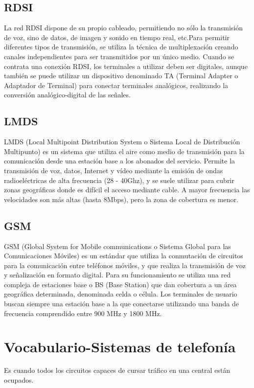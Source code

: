 \documentclass[
	11pt, %
	fleqn, %
	a4paper, %
]{LegrandOrangeBook}
\begin{document}
\subsection{RDSI}
La red RDSI dispone de su propio cableado, permitiendo no sólo la transmisión de voz, sino de datos, de imagen y sonido en tiempo real, etc.Para permitir diferentes tipos de transmisión, se utiliza la técnica de multiplexación creando canales independientes para ser transmitidos por un único medio. Cuando se contrata una conexión RDSI, los terminales a utilizar deben ser digitales, aunque también se puede utilizar un dispositivo denominado TA (Terminal Adapter o Adaptador de Terminal) para conectar terminales analógicos, realizando la conversión analógico-digital de las señales.
\subsection{LMDS}
LMDS (Local Multipoint Distribution System o Sistema Local de Distribución Multipunto) es un sistema que utiliza el aire como medio de transmisión para la comunicación desde una estación base a los abonados del servicio. Permite la transmisión de voz, datos, Internet y vídeo mediante la emisión de ondas radioeléctricas de alta frecuencia (28 - 40Ghz), y se suele utilizar para cubrir zonas geográficas donde es difícil el acceso mediante cable. A mayor frecuencia las velocidades son más altas (hasta 8Mbps), pero la zona de cobertura es menor.
\subsection{GSM}
GSM (Global System for Mobile communications o Sistema Global para las Comunicaciones Móviles) es un estándar que utiliza la conmutación de circuitos para la comunicación entre teléfonos móviles, y que realiza la transmisión de voz y señalización en formato digital. Para su funcionamiento se utiliza una red compleja de estaciones base o BS (Base Station) que dan cobertura a un área geográfica determinada, denominada celda o célula. Los terminales de usuario buscan siempre una estación base a la que conectarse utilizando una banda de frecuencia comprendido entre 900 MHz y 1800 MHz.
\newpage
\section*{Vocabulario-Sistemas de telefonía}
\begin{vocabulary}[Congestión]
Es cuando todos los circuitos capaces de cursar tráfico en una central están ocupados.
\end{vocabulary}
\end{document}

